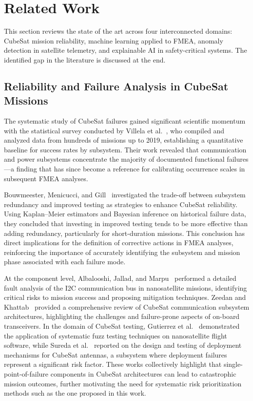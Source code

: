 \section{Related Work}
\label{sec:related_work}

This section reviews the state of the art across four interconnected domains: CubeSat mission reliability, machine learning applied to FMEA, anomaly detection in satellite telemetry, and explainable AI in safety-critical systems. The identified gap in the literature is discussed at the end.

\subsection{Reliability and Failure Analysis in CubeSat Missions}
\label{subsec:cubesat_reliability}

The systematic study of CubeSat failures gained significant scientific momentum with the statistical survey conducted by Villela et al.~\cite{villela2019towards}, who compiled and analyzed data from hundreds of missions up to 2019, establishing a quantitative baseline for success rates by subsystem. Their work revealed that communication and power subsystems concentrate the majority of documented functional failures---a finding that has since become a reference for calibrating occurrence scales in subsequent FMEA analyses.

Bouwmeester, Menicucci, and Gill~\cite{bouwmeester2022improving} investigated the trade-off between subsystem redundancy and improved testing as strategies to enhance CubeSat reliability. Using Kaplan--Meier estimators and Bayesian inference on historical failure data, they concluded that investing in improved testing tends to be more effective than adding redundancy, particularly for short-duration missions. This conclusion has direct implications for the definition of corrective actions in FMEA analyses, reinforcing the importance of accurately identifying the subsystem and mission phase associated with each failure mode.

At the component level, Albalooshi, Jallad, and Marpu~\cite{albalooshi2023fault} performed a detailed fault analysis of the I2C communication bus in nanosatellite missions, identifying critical risks to mission success and proposing mitigation techniques. Zeedan and Khattab~\cite{zeedan2023cubesat} provided a comprehensive review of CubeSat communication subsystem architectures, highlighting the challenges and failure-prone aspects of on-board transceivers. In the domain of CubeSat testing, Gutierrez et al.~\cite{gutierrez2021fuzz} demonstrated the application of systematic fuzz testing techniques on nanosatellite flight software, while Sureda et al.~\cite{sureda2021helix} reported on the design and testing of deployment mechanisms for CubeSat antennas, a subsystem where deployment failures represent a significant risk factor. These works collectively highlight that single-point-of-failure components in CubeSat architectures can lead to catastrophic mission outcomes, further motivating the need for systematic risk prioritization methods such as the one proposed in this work.

